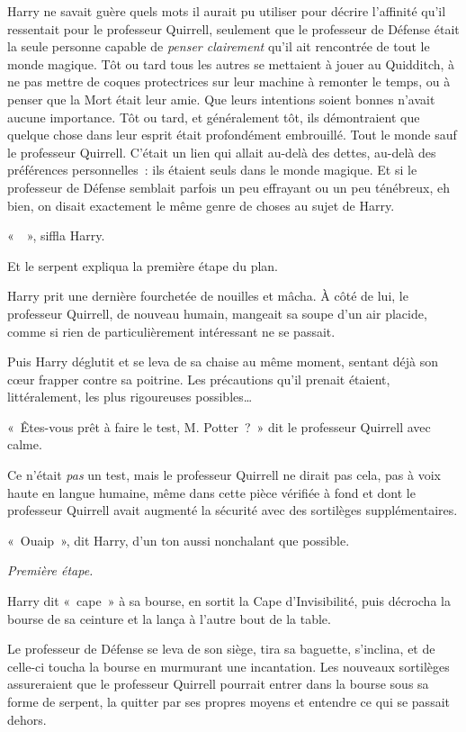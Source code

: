 Harry ne savait guère quels mots il aurait pu utiliser pour décrire l'affinité qu'il ressentait pour le professeur Quirrell, seulement que le professeur de Défense était la seule personne capable de \emph{penser clairement} qu'il ait rencontrée de tout le monde magique. Tôt ou tard tous les autres se mettaient à jouer au Quidditch, à ne pas mettre de coques protectrices sur leur machine à remonter le temps, ou à penser que la Mort était leur amie. Que leurs intentions soient bonnes n'avait aucune importance. Tôt ou tard, et généralement tôt, ils démontraient que quelque chose dans leur esprit était profondément embrouillé. Tout le monde sauf le professeur Quirrell. C'était un lien qui allait au-delà des dettes, au-delà des préférences personnelles~: ils étaient seuls dans le monde magique. Et si le professeur de Défense semblait parfois un peu effrayant ou un peu ténébreux, eh bien, on disait exactement le même genre de choses au sujet de Harry.

«~~», siffla Harry.

Et le serpent expliqua la première étape du plan.

\later

Harry prit une dernière fourchetée de nouilles et mâcha. À côté de lui, le professeur Quirrell, de nouveau humain, mangeait sa soupe d'un air placide, comme si rien de particulièrement intéressant ne se passait.

Puis Harry déglutit et se leva de sa chaise au même moment, sentant déjà son cœur frapper contre sa poitrine. Les précautions qu'il prenait étaient, littéralement, les plus rigoureuses possibles…

«~Êtes-vous prêt à faire le test, M. Potter~?~» dit le professeur Quirrell avec calme.

Ce n'était \emph{pas} un test, mais le professeur Quirrell ne dirait pas cela, pas à voix haute en langue humaine, même dans cette pièce vérifiée à fond et dont le professeur Quirrell avait augmenté la sécurité avec des sortilèges supplémentaires.

«~Ouaip~», dit Harry, d'un ton aussi nonchalant que possible.

\emph{Première étape.}

Harry dit «~cape~» à sa bourse, en sortit la Cape d'Invisibilité, puis décrocha la bourse de sa ceinture et la lança à l'autre bout de la table.

Le professeur de Défense se leva de son siège, tira sa baguette, s'inclina, et de celle-ci toucha la bourse en murmurant une incantation. Les nouveaux sortilèges assureraient que le professeur Quirrell pourrait entrer dans la bourse sous sa forme de serpent, la quitter par ses propres moyens et entendre ce qui se passait dehors.

